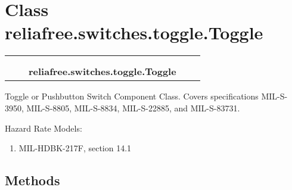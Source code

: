 %
%
%


\section{Class reliafree.switches.toggle.Toggle}

    \label{reliafree:switches:toggle:Toggle}
\begin{tabular}{cccccc}
\multicolumn{2}{r}{\settowidth{\BCL}{reliafree.switches.switch.Switch}\multirow{2}{\BCL}{reliafree.switches.switch.Switch}}
&&
  \\\cline{3-3}
  &&\multicolumn{1}{c|}{}
&&
  \\
&&\multicolumn{2}{l}{\textbf{reliafree.switches.toggle.Toggle}}
\end{tabular}

Toggle or Pushbutton Switch Component Class. Covers specifications 
MIL-S-3950, MIL-S-8805, MIL-S-8834, MIL-S-22885, and MIL-S-83731.

Hazard Rate Models:

\begin{enumerate}

\setlength{\parskip}{0.5ex}
  \item MIL-HDBK-217F, section 14.1

\end{enumerate}



  \subsection{Methods}

    \vspace{0.5ex}

